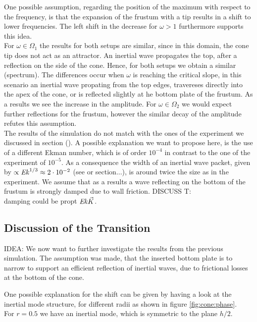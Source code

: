 One possible assumption, regarding the position of the maximum with respect to the frequency, is that
the expansion of the frustum with a tip  results in a shift to lower frequencies.
The left shift in the decrease for $\omega > 1$ furthermore supports this idea.\\
For $\omega\in\Omega_1$ the results for both setups are similar, since in this domain, the cone tip does not act as an attractor.
An inertial wave propagates the top, after a reflection on the side of the cone.
Hence, for both setups we obtain a similar (spectrum).
The differences occur when $\omega$ is reaching the critical slope, in this scenario an inertial wave propating from the
top edges, travereses directly into the apex of the cone, or is reflected slightly at he bottom plate of the frustum.
As a results we see the increase in the amplitude.
For $\omega\in \Omega_2$ we would expect further reflections for the frustum, however the similar
decay of the amplitude refutes this assumption.\\
The results of the simulation do not match with the ones of the experiment we discussed in section ().
A possible explanation we want to propose here, is the use of a different Ekman number, which is of order $10^{-4}$ in contrast
to the one of the experiment of $10^{-5}$.
As a consequence the width of an inertial wave packet, given by $\propto \mbox{\textit{Ek}}^{1/3} \approx 2\cdot10^{-2}$ (see \citep{} or section...),
is around twice the size as in the experiment. We assume that as a results a wave reflecting on the bottom of the frustum
is strongly damped due to wall friction.
DISCUSS T:\\
damping  could be propt $\mbox{\textit{Ek}} \vec{K}$.

\subsection{Discussion of the Transition}

IDEA:
We now want to further investigate the results from the previous simulation.
The assumption was made, that the inserted bottom plate is to narrow to support an efficient reflection
of inertial waves, due to frictional losses at the bottom of the cone.

One possible explanation for the shift can be given
by having a look at the inertial mode structure, for different radii as shown in figure \ref{fig:cone:phase}.\\
For $r=0.5$ we have an inertial mode, which is symmetric to the plane $h/2$.

